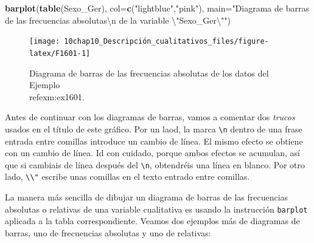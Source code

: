 \documentclass[
]{book}
\newenvironment{Shaded}{\begin{snugshade}}{\end{snugshade}}
\newcommand{\CharTok}[1]{\textcolor[rgb]{0.31,0.60,0.02}{#1}}
\newcommand{\DataTypeTok}[1]{\textcolor[rgb]{0.13,0.29,0.53}{#1}}
\newcommand{\KeywordTok}[1]{\textcolor[rgb]{0.13,0.29,0.53}{\textbf{#1}}}
\newcommand{\NormalTok}[1]{#1}
\newcommand{\StringTok}[1]{\textcolor[rgb]{0.31,0.60,0.02}{#1}}
\theoremstyle{definition}
\theoremstyle{definition}
\theoremstyle{definition}
\theoremstyle{remark}
\begin{document}
\begin{Shaded}
\begin{Highlighting}[]
\KeywordTok{barplot}\NormalTok{(}\KeywordTok{table}\NormalTok{(Sexo\_Ger), }\DataTypeTok{col=}\KeywordTok{c}\NormalTok{(}\StringTok{"lightblue"}\NormalTok{,}\StringTok{"pink"}\NormalTok{), }
        \DataTypeTok{main=}\StringTok{"Diagrama de barras de las frecuencias absolutas}\CharTok{\textbackslash{}n}\StringTok{ de la variable }\CharTok{\textbackslash{}"}\StringTok{Sexo\_Ger}\CharTok{\textbackslash{}"}\StringTok{"}\NormalTok{)}
\end{Highlighting}
\end{Shaded}

\begin{figure}

{\centering \texttt{[image: 10chap10\_Descripción\_cualitativos\_files/figure-latex/F1601-1]} 

}

\caption{Diagrama de barras de las frecuencias absolutas de los datos  del Ejemplo \\ref{exm:ex1601}.}\label{fig:F1601}
\end{figure}

Antes de continuar con los diagramas de barras, vamos a comentar dos \emph{trucos} usados en el título de este gráfico. Por un laod, la marca \texttt{\textbackslash{}n} dentro de una frase entrada entre comillas introduce un cambio de línea. El mismo efecto se obtiene con un cambio de línea. Id con cuidado, porque ambos efectos se acumulan, así que si cambiais de línea después del \texttt{\textbackslash{}n}, obtendréis una línea en blanco. Por otro lado, \texttt{\textbackslash{}\textbackslash{}"} escribe unas comillas en el texto entrado entre comillas.

La manera más sencilla de dibujar un diagrama de barras de las frecuencias absolutas o relativas de una variable cualitativa es usando la instrucción \texttt{barplot} aplicada a la tabla correspondiente. Veamos dos ejemplos más de diagramas de barras, uno de frecuencias absolutas y uno de relativas:
\end{document}
